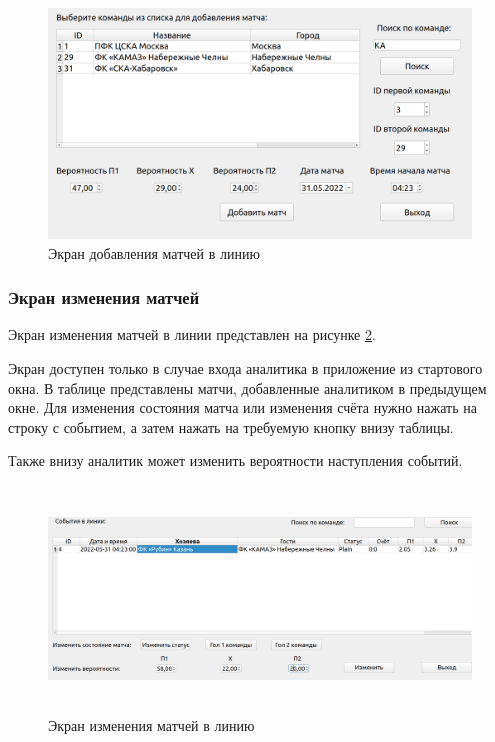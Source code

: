 \FloatBarrier
\begin{figure}[h]	
	\begin{center}
		\includegraphics[width=\linewidth]{inc/addMatch.png}
	\end{center}
	\caption{Экран добавления матчей в линию}
	\label{fig::add}
\end{figure}
\FloatBarrier

\subsubsection{Экран изменения матчей}
Экран изменения матчей в линии представлен на рисунке \ref{fig::change}.

Экран доступен только в случае входа аналитика в приложение из стартового окна.
В таблице представлены матчи, добавленные аналитиком в предыдущем окне.
Для изменения состояния матча или изменения счёта нужно нажать на строку с событием, а затем нажать на требуемую кнопку внизу таблицы.

Также внизу аналитик может изменить вероятности наступления событий.

\FloatBarrier
\begin{figure}[h]	
	\begin{center}
		\includegraphics[height=6cm, width=\linewidth]{inc/matches.png}
	\end{center}
	\caption{Экран изменения матчей в линию}
	\label{fig::change}
\end{figure}
\FloatBarrier

